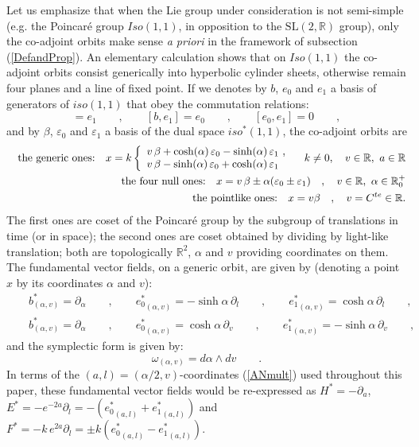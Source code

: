 \documentclass{article}
\newcommand{\R}{\mathbb R}
\newcommand{\SL}{\mbox{SL}(2,\mathbb{R})}
\newcommand{\p}{\partial}
\def \p{{\partial}}
\def \R{{\mathbb R}}
\newcommand{\re}[1]{(\ref{#1})}
\begin{document}
Let us emphasize that when the Lie group under consideration is not semi-simple (e.g. the Poincar\'e group $Iso(1,1)$, in opposition to the $\SL$ group), only the co-adjoint orbits make sense {\it a priori\/} in the framework of subsection (\ref{DefandProp}). An elementary calculation shows that on $Iso(1,1)$ the co-adjoint orbits consist generically into hyperbolic cylinder  sheets, otherwise  remain four  planes and a line of fixed point. If we denotes by $b$, $e_0$ and $e_1$ a basis of  generators of   $iso(1,1)$ that obey the commutation relations:
\begin{equation}
[b,e_0]=e_1\qquad,\qquad[b,e_1]=e_0\qquad,\qquad[e_0,e_1]=0\qquad,
\end{equation}
and by $\beta$, $\varepsilon_0$ and $\varepsilon_1$ a basis of the dual space $iso^*(1,1)$, the co-adjoint orbits are
\begin{eqnarray}
&&\mbox{\rm the generic ones:}\quad x=k\left\{\begin{array}l v\,\beta +  \cosh (\alpha)\, \varepsilon_0 -  \sinh(\alpha)\, \varepsilon_1\ ,\\
v\,\beta -   \sinh (\alpha)\, \varepsilon_0 +  \cosh(\alpha)\, \varepsilon_1 
\end{array}\right.
\quad k\neq 0,\quad v\in \R,\ a \in \R\\
&&\mbox{\rm the four null ones:}\quad x= v\,\beta \pm   \alpha( \varepsilon_0 \pm\varepsilon_1)\quad,\quad  v\in \R,\ \alpha \in \R_0^+\\
&&\mbox{\rm the pointlike ones:}\quad x= v\beta \quad ,\quad  v=C^{te}\in \R. 
\end{eqnarray}
The first ones are coset of the Poincar\'e group by the subgroup of translations in time (or in space); the second ones are coset obtained by dividing by light-like translation; both  are topologically $\R^2$,  $\alpha$ and $v$ providing coordinates on them.
The fundamental vector fields, on a generic orbit, are given by (denoting a point $x$ by its coordinates $\alpha$ and $v$):
\begin{eqnarray}
&&b^*_{( \alpha,v)}=\partial_\alpha\qquad,\qquad {e_0 ^*}_{( \alpha,v)}= - \sinh\alpha\,\partial_l\qquad,\qquad {e_1 ^*}_{( \alpha,v)}=  \cosh\alpha\,\partial_l\qquad,\\
&&b^*_{( \alpha,v)}=\partial_\alpha\qquad,\qquad {e_0 ^*}_{( \alpha,v)}=  \cosh\alpha\,\partial_v\qquad,\qquad {e_1 ^*}_{( \alpha,v)}=  -\sinh\alpha\,\partial_v\qquad,
\end{eqnarray}
and the symplectic form is given by:
\begin{equation}
\omega_{( \alpha,v)}=d\alpha\wedge dv\qquad.
\end{equation}
In terms of the $(a,l)=(\alpha/2,v)$-coordinates  \re{ANmult} used throughout this paper, these fundamental vector fields would be re-expressed as $H^* = -\p_a$, $E^*=-e^{-2a} \p_l=- ({e_0 ^*}_{(a,l)}+{e_1 ^*}_{(a,l)})$ and $F^*= -k\,e^{2a} \p_l=\pm k ({e_0 ^*}_{(a,l)}-{e_1 ^*}_{(a,l)})$.
\end{document}
